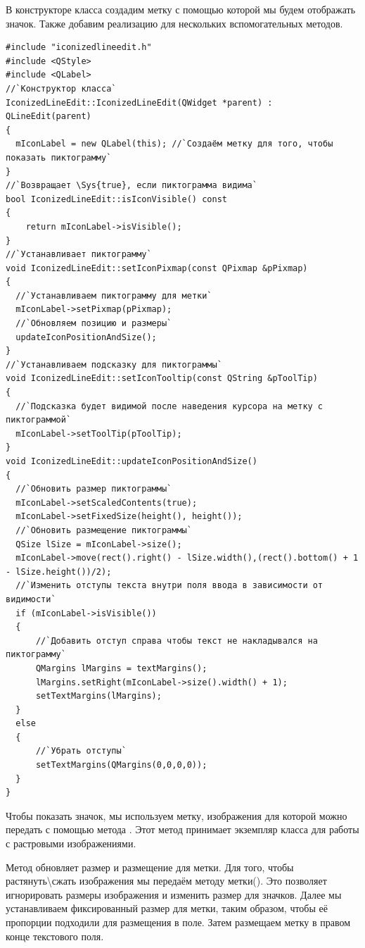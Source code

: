 В конструкторе класса создадим метку  с помощью которой мы будем отображать значок. Также добавим
реализацию для нескольких вспомогательных методов.
\begin{lstlisting}
#include "iconizedlineedit.h"
#include <QStyle>
#include <QLabel>
//`Конструктор класса`
IconizedLineEdit::IconizedLineEdit(QWidget *parent) : QLineEdit(parent)
{
  mIconLabel = new QLabel(this); //`Создаём метку для того, чтобы показать пиктограмму`
}
//`Возвращает \Sys{true}, если пиктограмма видима`
bool IconizedLineEdit::isIconVisible() const
{
    return mIconLabel->isVisible();
}
//`Устанавливает пиктограмму`
void IconizedLineEdit::setIconPixmap(const QPixmap &pPixmap)
{
  //`Устанавливаем пиктограмму для метки`
  mIconLabel->setPixmap(pPixmap);
  //`Обновляем позицию и размеры`
  updateIconPositionAndSize();
}
//`Устанавливаем подсказку для пиктограммы`
void IconizedLineEdit::setIconTooltip(const QString &pToolTip)
{
  //`Подсказка будет видимой после наведения курсора на метку с пиктограммой`
  mIconLabel->setToolTip(pToolTip);
}
void IconizedLineEdit::updateIconPositionAndSize()
{
  //`Обновить размер пиктограммы`
  mIconLabel->setScaledContents(true);
  mIconLabel->setFixedSize(height(), height());
  //`Обновить размещение пиктограммы`
  QSize lSize = mIconLabel->size();
  mIconLabel->move(rect().right() - lSize.width(),(rect().bottom() + 1 - lSize.height())/2);
  //`Изменить отступы текста внутри поля ввода в зависимости от видимости`
  if (mIconLabel->isVisible())
  {
      //`Добавить отступ справа чтобы текст не накладывался на пиктограмму`
      QMargins lMargins = textMargins();
      lMargins.setRight(mIconLabel->size().width() + 1);
      setTextMargins(lMargins);
  }
  else
  {
      //`Убрать отступы`
      setTextMargins(QMargins(0,0,0,0));
  }
}
\end{lstlisting}

Чтобы показать значок, мы используем метку, изображения для которой можно передать с помощью метода
. Этот метод принимает экземпляр  класса для работы с
растровыми изображениями.

Метод  обновляет размер и размещение для метки. Для того, чтобы
растянуть{\textbackslash}сжать изображения мы передаём  методу метки(). Это
позволяет игнорировать размеры изображения и изменить размер для значков. Далее мы устанавливаем фиксированный размер
для метки, таким образом, чтобы её пропорции подходили для размещения в поле. Затем размещаем метку в правом конце
текстового поля.

